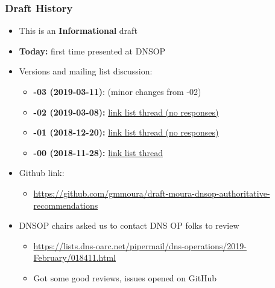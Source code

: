 \documentclass[11pt,show 
notes,notheorems,noamsthm,blank]{beamer} %
\begin{document}
\begin{frame}
\frametitle{Draft History}


\begin{itemize}


\item This is an \textbf{Informational} draft 
\item \textbf{Today:} first time presented at DNSOP 

\item Versions and mailing list discussion:

\begin{itemize}

  \item \textbf{-03 (2019-03-11)}: (minor changes from -02)   
  \item \textbf{-02 (2019-03-08):}   
\href{https://mailarchive.ietf.org/arch/msg/dnsop/u_w7KI7BkLmWQ7ii0P_PTEYBcus}{
 link  list thread (no responses) }
 
 

  \item \textbf{-01 (2018-12-20):} 
\href{https://mailarchive.ietf.org/arch/msg/dnsop/2R8Ab4-7sKmOY7-XcJ3yLSq6Gcc}{
 link list thread (no responses)} 


  \item \textbf{-00 (2018-11-28):}   
\href{https://mailarchive.ietf.org/arch/msg/dnsop/AMMr6dDDUmShnG90URv6AJCY_VQ}{
 link list thread}

\end{itemize}

\item Github link: 
\begin{itemize}
 \item \small
\url{https://github.com/gmmoura/draft-moura-dnsop-authoritative-recommendations}

\end{itemize}

\item DNSOP chairs asked us to contact DNS OP folks to review
    \begin{itemize}


        \item \url{https://lists.dns-oarc.net/pipermail/dns-operations/2019-February/018411.html}
        \item Got some good reviews, issues opened on GitHub

    \end{itemize}

\end{itemize}


\end{frame}
\end{document}
